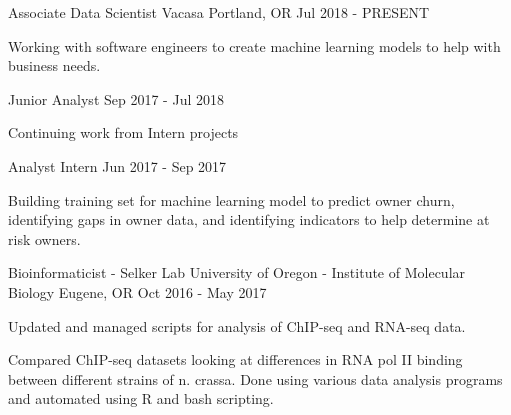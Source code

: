 

\begin{cventries}

  \cventry
    {Associate Data Scientist} %
    {Vacasa} %
    {Portland, OR} %
    {Jul 2018 - PRESENT} %
    {
      \begin{cvitems} %
        \item {Working with software engineers to create machine learning models to help with business needs.}
      \end{cvitems}
    }

  \cventry
    {Junior Analyst} %
    {} %
    {} %
    {Sep 2017 - Jul 2018} %
    {
      \begin{cvitems} %
        \item {Continuing work from Intern projects}
      \end{cvitems}
    }

  \cventry
    {Analyst Intern} %
    {} %
    {} %
    {Jun 2017 - Sep 2017} %
    {
      \begin{cvitems} %
        \item {Building training set for machine learning model to predict owner churn, identifying gaps in owner data, and identifying indicators to help determine at risk owners.}
      \end{cvitems}
    }

  \cventry
    {Bioinformaticist - Selker Lab} %
    {University of Oregon - Institute of Molecular Biology} %
    {Eugene, OR} %
    {Oct 2016 - May 2017} %
    {
      \begin{cvitems} %
        \item {Updated and managed scripts for analysis of ChIP-seq and RNA-seq data.}
        \item {Compared ChIP-seq datasets looking at differences in RNA pol II binding between different strains of n. crassa. Done using various data analysis programs and automated using R and bash scripting.}
      \end{cvitems}
    }


\end{cventries}
